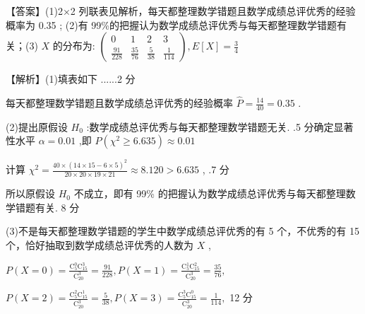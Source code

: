 \documentclass[10pt]{article}
\begin{document}
【答案】(1)2×2 列联表见解析，每天都整理数学错题且数学成绩总评优秀的经验概率为 0.35 ; (2)有 99\%的把握认为数学成绩总评优秀与每天都整理数学错题有关；(3) \(X\) 的分布为: \(\left( \begin{matrix} 0 & 1 & 2 & 3 \\  \frac{91}{228} & \frac{35}{76} & \frac{5}{38} & \frac{1}{114} \end{matrix}\right) ,E\left\lbrack  X\right\rbrack   = \frac{3}{4}\)

【解析】(1)填表如下 ......2 分

\begin{center}
\end{center}

每天都整理数学错题且数学成绩总评优秀的经验概率 \(\widehat{P} = \frac{14}{40} = {0.35}\) .

(2)提出原假设 \({H}_{0}\) :数学成绩总评优秀与每天都整理数学错题无关. .5 分确定显著性水平 \(\alpha  = {0.01}\) ,即 \(P\left( {{\chi }^{2} \geq  {6.635}}\right)  \approx  {0.01}\)

计算 \({\chi }^{2} = \frac{{40} \times  {\left( {14} \times  {15} - 6 \times  5\right) }^{2}}{{20} \times  {20} \times  {19} \times  {21}} \approx  {8.120} > {6.635}\) , .7 分

所以原假设 \({H}_{0}\) 不成立，即有 99\% 的把握认为数学成绩总评优秀与每天都整理数学错题有关. 8 分

(3)不是每天都整理数学错题的学生中数学成绩总评优秀的有 5 个，不优秀的有 15 个，恰好抽取到数学成绩总评优秀的人数为 \(X\) ,

\(P\left( {X = 0}\right)  = \frac{{\mathrm{C}}_{5}^{0}{\mathrm{C}}_{15}^{3}}{{\mathrm{C}}_{20}^{3}} = \frac{91}{228},P\left( {X = 1}\right)  = \frac{{\mathrm{C}}_{5}^{1}{\mathrm{C}}_{15}^{2}}{{\mathrm{C}}_{20}^{3}} = \frac{35}{76},\)

\(P\left( {X = 2}\right)  = \frac{{\mathrm{C}}_{5}^{2}{\mathrm{C}}_{15}^{1}}{{\mathrm{C}}_{20}^{3}} = \frac{5}{38},P\left( {X = 3}\right)  = \frac{{\mathrm{C}}_{5}^{3}{\mathrm{C}}_{15}^{0}}{{\mathrm{C}}_{20}^{3}} = \frac{1}{114},\) 12 分
\end{document}
